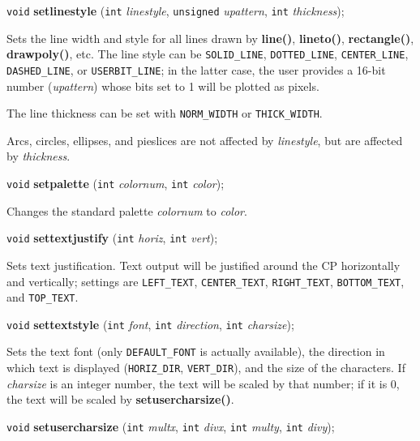 \documentclass[a4paper,11pt]{article}
\newcommand{\V}{\texttt{void}}      %
\newcommand{\I}{\texttt{int}}       %
\newcommand{\func}[1]{\textbf{#1}}  %
\newcommand{\A}[1]{\emph{#1}}       %
\newcommand{\T}[1]{\texttt{#1}}     %
\newenvironment{bgi}
{ %
  \begin{snugshade}
}
{ %
  \end{snugshade}
}
\begin{document}

\begin{bgi}
\V{} \func{setlinestyle} (\I{} \A{linestyle}, \texttt{unsigned}
\A{upattern}, \I{} \A{thickness});
\end{bgi}

Sets the line width and style for all lines drawn by \func{line()},
\func{lineto()}, \func{rectangle()}, \func{drawpoly()}, etc. The line
style can be \T{SOLID\_LINE}, \T{DOTTED\_LINE}, \T{CENTER\_LINE},
\T{DASHED\_LINE}, or \T{USERBIT\_LINE}; in the latter case, the user
provides a 16-bit number (\A{upattern}) whose bits set to 1 will be
plotted as pixels.

The line thickness can be set with \T{NORM\_WIDTH} or
\T{THICK\-\_WIDTH}.

Arcs, circles, ellipses, and pieslices are not affected by
\A{linestyle}, but are affected by \A{thickness}.


\begin{bgi}
\V{} \func{setpalette} (\I{} \A{colornum}, \I{} \A{color}); 
\end{bgi}

Changes the standard palette \A{colornum} to \A{color}.


\begin{bgi}
\V{} \func{settextjustify} (\I{} \A{horiz}, \I{} \A{vert});
\end{bgi}

Sets text justification. Text output will be justified around the CP
horizontally and vertically; settings are \T{LEFT\_TEXT},
\T{CENTER\_TEXT}, \T{RIGHT\-\_TEXT}, \T{BOTTOM\_TEXT}, and
\T{TOP\_TEXT}.


\begin{bgi}
\V{} \func{settextstyle} (\I{} \A{font}, \I{} \A{direction}, \I{}
\A{charsize});
\end{bgi}

Sets the text font (only \T{DEFAULT\_FONT} is actually available), the
direction in which text is displayed (\T{HORIZ\_DIR}, \T{VERT\_DIR}),
and the size of the characters. If \A{charsize} is an integer number,
the text will be scaled by that number; if it is 0, the text will be
scaled by \func{setusercharsize()}.



\begin{bgi}
\V{} \func{setusercharsize} (\I{} \A{multx}, \I{} \A{divx}, \I{}
\A{multy}, \I{} \A{divy});
\end{bgi}
\end{document}
